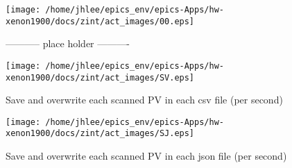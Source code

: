 \noindent
\vspace{1.4cm}
\begin{minipage}{.2\textwidth}
\begin{center}
\texttt{[image: /home/jhlee/epics\_env/epics-Apps/hw-xenon1900/docs/zint/act\_images/00.eps]}
\end{center}
\end{minipage}
\begin{minipage}{.7\textwidth}
----------- place holder ----------
\end{minipage}


\noindent
\vspace{1.4cm}
\begin{minipage}{.2\textwidth}
\begin{center}
\texttt{[image: /home/jhlee/epics\_env/epics-Apps/hw-xenon1900/docs/zint/act\_images/SV.eps]}
\end{center}
\end{minipage}
\begin{minipage}{.7\textwidth}
Save and overwrite each scanned PV in each csv file (per second)
\end{minipage}


\noindent
\vspace{1.4cm}
\begin{minipage}{.2\textwidth}
\begin{center}
\texttt{[image: /home/jhlee/epics\_env/epics-Apps/hw-xenon1900/docs/zint/act\_images/SJ.eps]}
\end{center}
\end{minipage}
\begin{minipage}{.7\textwidth}
Save and overwrite each scanned PV in each json file (per second)
\end{minipage}


